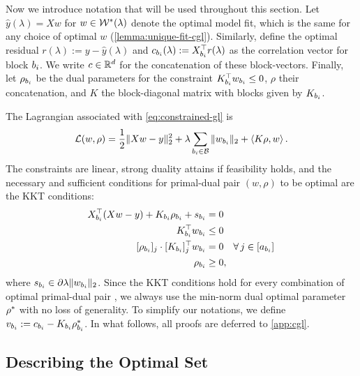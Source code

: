 Now we introduce notation that will be used throughout this section.
Let \( \hat y(\lambda) = X w \) for \( w \in \mathcal{W}^*(\lambda) \) denote
the optimal model fit, which is the same for any choice of optimal \( w \)
(\cref{lemma:unique-fit-cgl}).
Similarly, define the optimal residual \( r(\lambda) := y - \hat y(\lambda) \)
and \( c_{b_i}(\lambda) := X_{b_i}^\top r(\lambda) \) as the
correlation vector for block \( {b_i} \).
We write \( c \in \mathbb{R}^d \) for the concatenation
of these block-vectors.
Finally, let \( \rho_{{b_i}} \) be the dual parameters for the constraint
\( K_{{b_i}}^\top w_{b_i} \leq 0 \), \( \rho \) their concatenation,
and \( K \) the block-diagonal matrix with blocks given by \( K_{{b_i}} \).

The Lagrangian associated with \cref{eq:constrained-gl} is
\begin{equation}\label{eq:lagrangian-cgl}
    \mathcal{L}(w, \rho) = \frac 1 2 \|X w - y\|_2^2 + \lambda \sum_{{b_i} \in \mathcal{B}} \|w_{b_i}\|_2 + \left\langle K \rho, w\right\rangle.
\end{equation}
The constraints are linear, strong duality attains if feasibility holds,
and the necessary and sufficient conditions for primal-dual pair \( (w, \rho) \)
to be optimal are the KKT conditions:
\begin{equation}\label{eq:kkt-cgl}
    \begin{aligned}
        \Xbi^\top (X w - y) + \Ki \ri + s_\bi & = 0                                \\
        \Ki^\top \wi                          & \leq 0                             \\
        [\ri]_j \cdot [\Ki]_j^\top \wi        & = 0 \quad \forall \, j \in [a_\bi] \\
        \ri                                   & \geq 0,
    \end{aligned}
\end{equation}
where \( s_{b_i} \in \partial \lambda \|w_{b_i}\|_2 \).
Since the KKT conditions hold for every combination of optimal primal-dual
pair \citep{boyd2014convex}, we always use the min-norm dual
optimal parameter \( \rho^* \) with no loss of generality.
To simplify our notations, we define \( v_{b_i} := c_{b_i} - K_{{b_i}} \rho^*_{b_i} \).
In what follows, all proofs are deferred to \cref{app:cgl}.

\subsection{Describing the Optimal Set}

